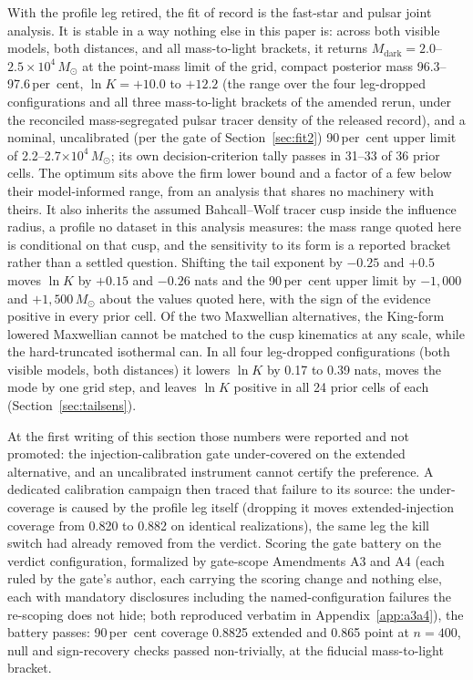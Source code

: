 \documentclass[11pt]{article}
\newcommand{\msun}{\ensuremath{M_\odot}}
\newcommand{\mdark}{\ensuremath{M_{\mathrm{dark}}}}
\newcommand{\lnK}{\ensuremath{\ln K}}
\begin{document}
With the profile leg retired, the fit of record is the fast-star and pulsar joint analysis. It is stable in a way nothing else in this paper is: across both visible models, both distances, and all mass-to-light brackets, it returns $\mdark = 2.0$--$2.5\times10^{4}\,\msun$ at the point-mass limit of the grid, compact posterior mass 96.3--97.6\,per~cent, $\lnK = +10.0$ to $+12.2$ (the range over the four leg-dropped configurations and all three mass-to-light brackets of the amended rerun, under the reconciled mass-segregated pulsar tracer density of the released record), and a nominal, uncalibrated (per the gate of Section~\ref{sec:fit2}) 90\,per~cent upper limit of 2.2--2.7$\times10^{4}\,\msun$; its own decision-criterion tally passes in 31--33 of 36 prior cells. The optimum sits above the \citet{Haberle2024Nature} firm lower bound and a factor of a few below their model-informed range, from an analysis that shares no machinery with theirs. It also inherits the assumed Bahcall--Wolf tracer cusp inside the influence radius, a profile no dataset in this analysis measures: the mass range quoted here is conditional on that cusp, and the sensitivity to its form is a reported bracket rather than a settled question. Shifting the tail exponent by $-0.25$ and $+0.5$ moves $\lnK$ by $+0.15$ and $-0.26$ nats and the 90\,per~cent upper limit by $-1{,}000$ and $+1{,}500\,\msun$ about the values quoted here, with the sign of the evidence positive in every prior cell. Of the two Maxwellian alternatives, the King-form lowered Maxwellian cannot be matched to the cusp kinematics at any scale, while the hard-truncated isothermal can. In all four leg-dropped configurations (both visible models, both distances) it lowers $\lnK$ by 0.17 to 0.39 nats, moves the mode by one grid step, and leaves $\lnK$ positive in all 24 prior cells of each (Section~\ref{sec:tailsens}).

At the first writing of this section those numbers were reported and not promoted: the injection-calibration gate under-covered on the extended alternative, and an uncalibrated instrument cannot certify the preference. A dedicated calibration campaign then traced that failure to its source: the under-coverage is caused by the profile leg itself (dropping it moves extended-injection coverage from 0.820 to 0.882 on identical realizations), the same leg the kill switch had already removed from the verdict. Scoring the gate battery on the verdict configuration, formalized by gate-scope Amendments A3 and A4 (each ruled by the gate's author, each carrying the scoring change and nothing else, each with mandatory disclosures including the named-configuration failures the re-scoping does not hide; both reproduced verbatim in Appendix~\ref{app:a3a4}), the battery passes: 90\,per~cent coverage 0.8825 extended and 0.865 point at $n = 400$, null and sign-recovery checks passed non-trivially, at the fiducial mass-to-light bracket.
\end{document}
